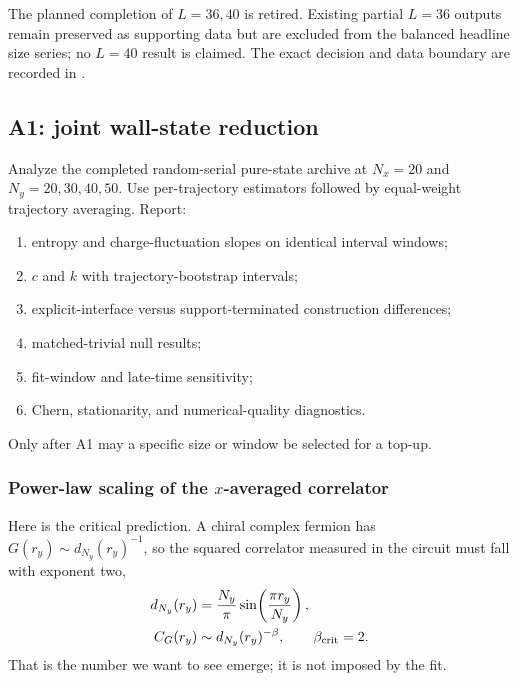\documentclass[aps,prx,twocolumn,floatfix,nofootinbib,superscriptaddress]{revtex4-2}
\begin{document}
The planned completion of $L=36,40$ is retired.  Existing partial $L=36$
outputs remain preserved as supporting data but are excluded from the balanced
headline size series; no $L=40$ result is claimed.  The exact decision and data
boundary are recorded in
.

\subsection{A1: joint wall-state reduction}

Analyze the completed random-serial pure-state archive at $N_x=20$ and
$N_y=20,30,40,50$.  Use per-trajectory estimators followed by equal-weight
trajectory averaging.  Report:
\begin{enumerate}
\item entropy and charge-fluctuation slopes on identical interval windows;
\item $c$ and $k$ with trajectory-bootstrap intervals;
\item explicit-interface versus support-terminated construction differences;
\item matched-trivial null results;
\item fit-window and late-time sensitivity;
\item Chern, stationarity, and numerical-quality diagnostics.
\end{enumerate}
Only after A1 may a specific size or window be selected for a top-up.

\subsubsection{Power-law scaling of the $x$-averaged correlator}

Here is the critical prediction.  A chiral complex fermion has
$G(r_y)\sim d_{N_y}(r_y)^{-1}$, so the squared correlator measured in the
circuit must fall with exponent two,
\begin{equation}
 \begin{aligned}
 d_{N_y}(r_y)&=\frac{N_y}{\pi}
 \sin\!\left(\frac{\pi r_y}{N_y}\right),\\
 C_G(r_y)&\sim d_{N_y}(r_y)^{-\beta},
 \qquad \beta_{\rm crit}=2.
 \end{aligned}
 \label{eq:wall-correlator-critical-prediction}
\end{equation}
That is the number we want to see emerge; it is not imposed by the fit.
\end{document}
